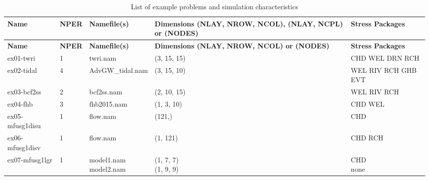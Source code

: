 
\small
\begin{longtable}{p{3cm} p{1cm} p{3cm} p{2.5cm}p{4cm}}
\caption{List of example problems and simulation characteristics}\tabularnewline


\hline
\hline
\textbf{Name} & \textbf{NPER} & \textbf{Namefile(s)} & \textbf{Dimensions (NLAY, NROW, NCOL), (NLAY, NCPL) or (NODES)}  & \textbf{Stress Packages} \\
\hline
\endfirsthead

\hline
\hline
\textbf{Name} & \textbf{NPER} & \textbf{Namefile(s)} & \textbf{Dimensions (NLAY, NROW, NCOL) or (NODES)}  & \textbf{Stress Packages} \\
\hline
\endhead

    
ex01-twri & 1 & \parbox[t]{3cm}{ twri.nam \\}& \parbox[t]{3cm}{ (3, 15, 15) \\}& \parbox[t]{4cm}{ CHD WEL DRN RCH  \\}\\
\hline
ex02-tidal & 4 & \parbox[t]{3cm}{ AdvGW\_tidal.nam \\}& \parbox[t]{3cm}{ (3, 15, 10) \\}& \parbox[t]{4cm}{ WEL RIV RCH GHB EVT  \\}\\
\hline
ex03-bcf2ss & 2 & \parbox[t]{3cm}{ bcf2ss.nam \\}& \parbox[t]{3cm}{ (2, 10, 15) \\}& \parbox[t]{4cm}{ WEL RIV RCH  \\}\\
\hline
ex04-fhb & 3 & \parbox[t]{3cm}{ fhb2015.nam \\}& \parbox[t]{3cm}{ (1, 3, 10) \\}& \parbox[t]{4cm}{ CHD WEL  \\}\\
\hline
ex05-mfusg1disu & 1 & \parbox[t]{3cm}{ flow.nam \\}& \parbox[t]{3cm}{ (121,) \\}& \parbox[t]{4cm}{ CHD  \\}\\
\hline
ex06-mfusg1disv & 1 & \parbox[t]{3cm}{ flow.nam \\}& \parbox[t]{3cm}{ (1, 121) \\}& \parbox[t]{4cm}{ CHD RCH  \\}\\
\hline
ex07-mfusg1lgr & 1 & \parbox[t]{3cm}{ model1.nam \\ model2.nam \\}& \parbox[t]{3cm}{ (1, 7, 7) \\ (1, 9, 9) \\}& \parbox[t]{4cm}{ CHD  \\ none \\}\\

\end{longtable}
